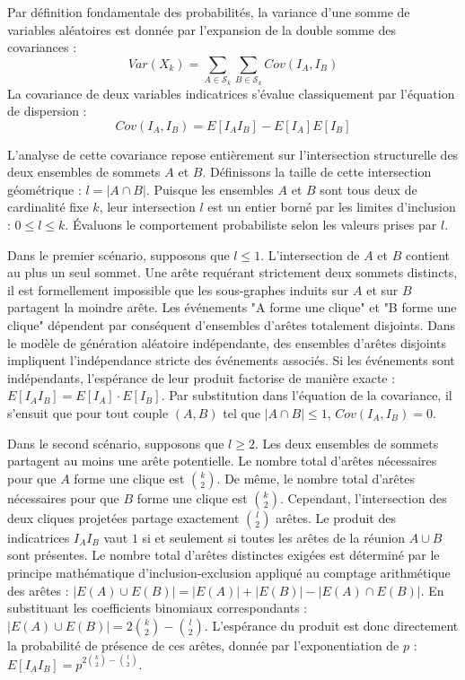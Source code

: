 \documentclass[11pt, a4paper]{article}
\begin{document}
Par définition fondamentale des probabilités, la variance d'une somme de variables aléatoires est donnée par l'expansion de la double somme des covariances :
$$Var(X_k) = \sum_{A \in \mathcal{S}_k} \sum_{B \in \mathcal{S}_k} Cov(I_A, I_B)$$
La covariance de deux variables indicatrices s'évalue classiquement par l'équation de dispersion :
$$Cov(I_A, I_B) = E[I_A I_B] - E[I_A]E[I_B]$$

L'analyse de cette covariance repose entièrement sur l'intersection structurelle des deux ensembles de sommets $A$ et $B$.
Définissons la taille de cette intersection géométrique : $l = |A \cap B|$.
Puisque les ensembles $A$ et $B$ sont tous deux de cardinalité fixe $k$, leur intersection $l$ est un entier borné par les limites d'inclusion : $0 \le l \le k$.
Évaluons le comportement probabiliste selon les valeurs prises par $l$.

Dans le premier scénario, supposons que $l \le 1$.
L'intersection de $A$ et $B$ contient au plus un seul sommet. Une arête requérant strictement deux sommets distincts, il est formellement impossible que les sous-graphes induits sur $A$ et sur $B$ partagent la moindre arête.
Les événements "A forme une clique" et "B forme une clique" dépendent par conséquent d'ensembles d'arêtes totalement disjoints. Dans le modèle de génération aléatoire indépendante, des ensembles d'arêtes disjoints impliquent l'indépendance stricte des événements associés.
Si les événements sont indépendants, l'espérance de leur produit factorise de manière exacte :
$E[I_A I_B] = E[I_A] \cdot E[I_B]$.
Par substitution dans l'équation de la covariance, il s'ensuit que pour tout couple $(A, B)$ tel que $|A \cap B| \le 1$, $Cov(I_A, I_B) = 0$.

Dans le second scénario, supposons que $l \ge 2$.
Les deux ensembles de sommets partagent au moins une arête potentielle.
Le nombre total d'arêtes nécessaires pour que $A$ forme une clique est $\binom{k}{2}$.
De même, le nombre total d'arêtes nécessaires pour que $B$ forme une clique est $\binom{k}{2}$.
Cependant, l'intersection des deux cliques projetées partage exactement $\binom{l}{2}$ arêtes.
Le produit des indicatrices $I_A I_B$ vaut $1$ si et seulement si toutes les arêtes de la réunion $A \cup B$ sont présentes.
Le nombre total d'arêtes distinctes exigées est déterminé par le principe mathématique d'inclusion-exclusion appliqué au comptage arithmétique des arêtes :
$|E(A) \cup E(B)| = |E(A)| + |E(B)| - |E(A) \cap E(B)|$.
En substituant les coefficients binomiaux correspondants :
$|E(A) \cup E(B)| = 2\binom{k}{2} - \binom{l}{2}$.
L'espérance du produit est donc directement la probabilité de présence de ces arêtes, donnée par l'exponentiation de $p$ :
$E[I_A I_B] = p^{2\binom{k}{2} - \binom{l}{2}}$.
\end{document}
